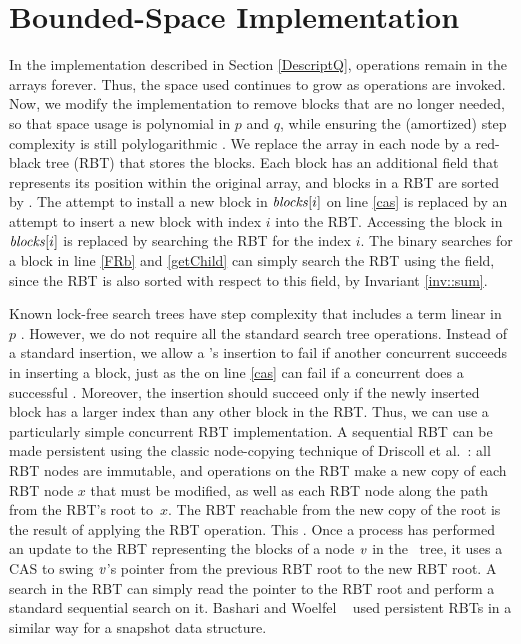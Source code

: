 
\section{Bounded-Space Implementation}
\label{reducing}

In the implementation described in Section \ref{DescriptQ}, 
operations remain in the  arrays forever. 
Thus, the space used continues to grow as operations are invoked.
Now, we modify the implementation to remove blocks that are no longer needed, so that space usage is
polynomial in $p$ and $q$, while ensuring the (amortized) step complexity is still polylogarithmic . We replace the  array in each node by a red-black tree (RBT)
that stores the blocks.
Each block has an additional  field
that represents its position within the original  array, and
blocks in a RBT are sorted by .
The attempt to install a new block in $\mbox{\textit{blocks}}[i]$  on line \ref{cas}
is replaced by an attempt to insert a new block with index $i$ into the RBT.
Accessing the block in $\mbox{\textit{blocks}}[i]$ is 
replaced by searching the RBT for the  index $i$.
The binary searches for a block in line \ref{FRb} and \ref{getChild} can simply search the RBT
using the  field, since the RBT is also sorted with respect to this field, by Invariant \ref{inv::sum}.
 
Known lock-free search trees have step complexity that includes a term linear in $p$ \cite{EFHR14,Ko20}.  
However, we do not require all the standard search tree operations.
Instead of a standard insertion, we allow a 's insertion to fail if another
concurrent  succeeds in inserting a block, just as the  on line \ref{cas}
can fail if a concurrent  does a successful .
Moreover, the insertion should succeed only if the newly inserted block has a larger index than any other block in the RBT.
Thus, we can use a particularly simple concurrent RBT implementation.
A sequential RBT can be made persistent using the classic node-copying technique of 
Driscoll et al.~\cite{DSST89}:  all RBT nodes are immutable, and operations on the 
RBT make a new copy of each RBT node $x$ that must be modified, as well
as each RBT node along the path from the RBT's root to~$x$.
The RBT reachable from the new copy of the root is the result of applying the RBT operation.
This .
Once a process has performed an update to the RBT representing the blocks of a node 
$\mbox{\textnormal{\textit{v}}}$ in the \ordering\ tree, 
it uses a CAS to swing $\mbox{\textnormal{\textit{v}}}$'s pointer from the previous RBT root to the new RBT root.
A search in the RBT can simply read the pointer to the RBT root and perform a standard
sequential search on it.
Bashari and Woelfel ~\cite{DBLP:conf/podc/BashariW21} used persistent RBTs in a similar way for a snapshot data structure.

